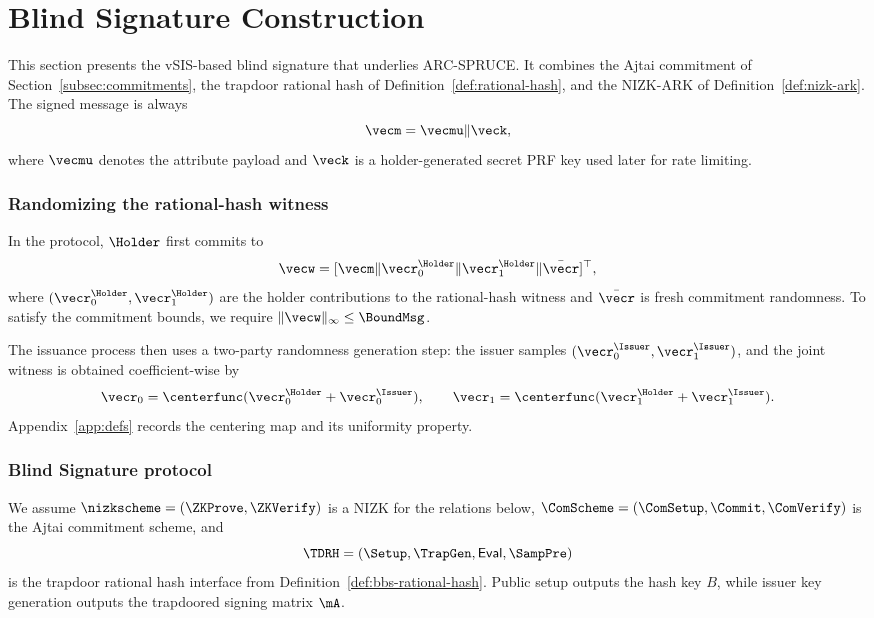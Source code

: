 \section{Blind Signature Construction}
\label{sec:blind-signature}

This section presents the vSIS-based blind signature that underlies ARC-SPRUCE. It combines the Ajtai commitment of
Section~\ref{subsec:commitments}, the trapdoor rational hash of Definition~\ref{def:rational-hash}, and the NIZK-ARK of
Definition~\ref{def:nizk-ark}. The signed message is always
\[
  \vecm=\vecmu\Vert \veck,
\]
where \(\vecmu\) denotes the attribute payload and \(\veck\) is a holder-generated secret PRF key used later for rate
limiting.

\subsubsection{Randomizing the rational-hash witness}
In the protocol, \(\Holder\) first commits to
\[
  \vecw=[\vecm\Vert \vecr_0^{\Holder}\Vert \vecr_1^{\Holder}\Vert \bar\vecr]^\top,
\]
where \((\vecr_0^{\Holder},\vecr_1^{\Holder})\) are the holder contributions to the rational-hash witness and
\(\bar\vecr\) is fresh commitment randomness. To satisfy the commitment bounds, we require
\(\|\vecw\|_\infty\le \BoundMsg\).

The issuance process then uses a two-party randomness generation step: the issuer samples
\((\vecr_0^{\Issuer},\vecr_1^{\Issuer})\), and the joint witness is obtained coefficient-wise by
\[
  \vecr_0=\centerfunc(\vecr_0^{\Holder}+\vecr_0^{\Issuer}),\qquad
  \vecr_1=\centerfunc(\vecr_1^{\Holder}+\vecr_1^{\Issuer}).
\]
Appendix~\ref{app:defs} records the centering map and its uniformity property.

\subsubsection{Blind Signature protocol}
\label{subsec:issuance-protocol}
We assume \(\nizkscheme=(\ZKProve,\ZKVerify)\) is a NIZK for the relations below,
\(\ComScheme=(\ComSetup,\Commit,\ComVerify)\) is the Ajtai commitment scheme, and
\[
  \TDRH=(\Setup,\TrapGen,\mathsf{Eval},\SampPre)
\]
is the trapdoor rational hash interface from Definition~\ref{def:bbs-rational-hash}. Public setup outputs the hash key
\(B\), while issuer key generation outputs the trapdoored signing matrix \(\mA\).

